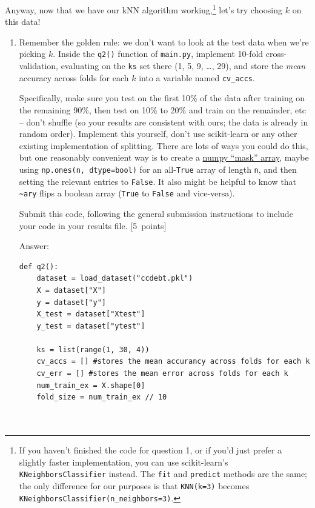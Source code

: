 \documentclass{article}
\newcommand{\blu}[1]{{\textcolor{blu}{#1}}}
\let\ask\blu
\newcommand\pts[1]{\textcolor{pointscolour}{[#1~points]}}
\begin{document}
    Anyway, now that we have our kNN algorithm working,\footnote{If you haven't finished the code for question 1, or if you'd just prefer a slightly faster implementation, you can use scikit-learn's \texttt{KNeighborsClassifier} instead. The \texttt{fit} and \texttt{predict} methods are the same; the only difference for our purposes is that \texttt{KNN(k=3)} becomes \texttt{KNeighborsClassifier(n\_neighbors=3)}.} let's try choosing $k$ on this data!

    \begin{enumerate}
        \item Remember the golden rule: we don't want to look at the test data when we're picking $k$. Inside the \texttt{q2()} function of \texttt{main.py}, implement 10-fold cross-validation, evaluating on the \texttt{ks} set there (1, 5, 9, \dots, 29), and store the \emph{mean} accuracy across folds for each $k$ into a variable named \texttt{cv\_accs}.

        Specifically, make sure you test on the first 10\% of the data after training on the remaining 90\%, then test on 10\% to 20\% and train on the remainder, etc -- don't shuffle (so your results are consistent with ours; the data is already in random order). Implement this yourself, don't use scikit-learn or any other existing implementation of splitting. There are lots of ways you could do this, but one reasonably convenient way is to create a \href{https://numpy.org/doc/stable/user/basics.indexing.html#boolean-or-mask-index-arrays}{numpy ``mask'' array}, maybe using \texttt{np.ones(n, dtype=bool)} for an all-\texttt{True} array of length \texttt{n}, and then setting the relevant entries to \texttt{False}. It also might be helpful to know that \texttt{\textasciitilde ary} flips a boolean array (\texttt{True} to \texttt{False} and vice-versa).

        \ask{Submit this code}, following the general submission instructions to include your code in your results file. \pts{5}

        \par\noindent\textcolor{gre}{Answer:}
\begin{lstlisting}
def q2():
    dataset = load_dataset("ccdebt.pkl")
    X = dataset["X"]
    y = dataset["y"]
    X_test = dataset["Xtest"]
    y_test = dataset["ytest"]

    ks = list(range(1, 30, 4))
    cv_accs = [] #stores the mean accurancy across folds for each k
    cv_err = [] #stores the mean error across folds for each k 
    num_train_ex = X.shape[0]
    fold_size = num_train_ex // 10



\end{lstlisting}
\end{enumerate}
\end{document}
